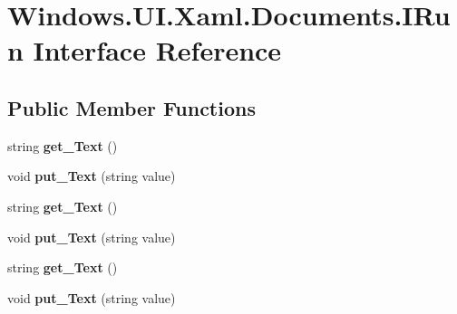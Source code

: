 \hypertarget{interface_windows_1_1_u_i_1_1_xaml_1_1_documents_1_1_i_run}{}\section{Windows.\+U\+I.\+Xaml.\+Documents.\+I\+Run Interface Reference}
\label{interface_windows_1_1_u_i_1_1_xaml_1_1_documents_1_1_i_run}
\subsection*{Public Member Functions}
\begin{DoxyCompactItemize}
\item 
\mbox{\label{interface_windows_1_1_u_i_1_1_xaml_1_1_documents_1_1_i_run_aba9ba75d04a782c32cbb2d70e3aef9c0}} 
string {\bfseries get\+\_\+\+Text} ()
\item 
\mbox{\label{interface_windows_1_1_u_i_1_1_xaml_1_1_documents_1_1_i_run_af328b828b9f7a37c37d715c2bc5f8552}} 
void {\bfseries put\+\_\+\+Text} (string value)
\item 
\mbox{\label{interface_windows_1_1_u_i_1_1_xaml_1_1_documents_1_1_i_run_aba9ba75d04a782c32cbb2d70e3aef9c0}} 
string {\bfseries get\+\_\+\+Text} ()
\item 
\mbox{\label{interface_windows_1_1_u_i_1_1_xaml_1_1_documents_1_1_i_run_af328b828b9f7a37c37d715c2bc5f8552}} 
void {\bfseries put\+\_\+\+Text} (string value)
\item 
\mbox{\label{interface_windows_1_1_u_i_1_1_xaml_1_1_documents_1_1_i_run_aba9ba75d04a782c32cbb2d70e3aef9c0}} 
string {\bfseries get\+\_\+\+Text} ()
\item 
\mbox{\label{interface_windows_1_1_u_i_1_1_xaml_1_1_documents_1_1_i_run_af328b828b9f7a37c37d715c2bc5f8552}} 
void {\bfseries put\+\_\+\+Text} (string value)
\item 

\end{DoxyCompactItemize}
